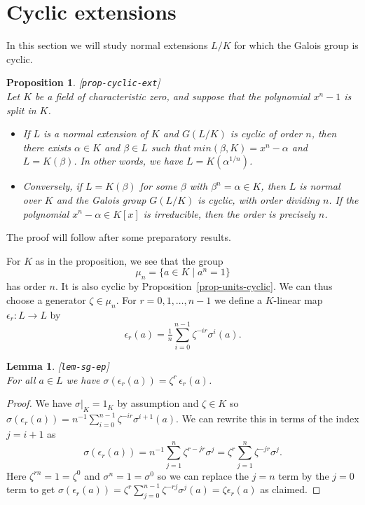 \documentclass{amsart}
\newcommand{\lbl}[1]{\label{#1}\textup{[\texttt{#1}]}\ \\}
\newcommand{\lbl}{\label}
\newcommand{\al}        {\alpha}
\newcommand{\bt}        {\beta}
\newcommand{\zt}        {\zeta}
\newcommand{\ep}        {\epsilon}
\newcommand{\sg}        {\sigma}
\newcommand{\st}        {\;|\;}
\renewcommand{\:}{\colon}
\newtheorem{lemma}[theorem]{Lemma}
\newtheorem{proposition}[theorem]{Proposition}
\theoremstyle{definition}
\begin{document}
\section{Cyclic extensions}
\label{sec-cyclic}

In this section we will study normal extensions $L/K$ for which the
Galois group is cyclic.

\begin{proposition}\lbl{prop-cyclic-ext}
 Let $K$ be a field of characteristic zero, and suppose that the
 polynomial $x^n-1$ is split in $K$.
 \begin{itemize}
  \item[(a)] If $L$ is a normal extension of $K$ and $G(L/K)$ is
   cyclic of order $n$, then there exists $\al\in K$ and $\bt\in L$
   such that $min(\bt,K)=x^n-\al$ and $L=K(\bt)$.  In other words, we
   have $L=K(\al^{1/n})$.
  \item[(b)] Conversely, if $L=K(\bt)$ for some $\bt$ with
   $\bt^n=\al\in K$, then $L$ is normal over $K$ and the Galois group
   $G(L/K)$ is cyclic, with order dividing $n$.  If the polynomial
   $x^n-\al\in K[x]$ is irreducible, then the order is precisely $n$. 
 \end{itemize}
\end{proposition}

The proof will follow after some preparatory results.

For $K$ as in the proposition, we see that the group 
\[ \mu_n = \{a\in K\st a^n=1\} \] 
has order $n$.  It is also cyclic by
Proposition~\ref{prop-units-cyclic}.  We can thus choose a generator
$\zt\in\mu_n$.  For $r=0,1,\dotsc,n-1$ we define a $K$-linear map
$\ep_r\:L\to L$ by 
\[ \ep_r(a) = \tfrac{1}{n} \sum_{i=0}^{n-1}\zt^{-ir}\sg^i(a).  \]

\begin{lemma}\lbl{lem-sg-ep}
 For all $a\in L$ we have $\sg(\ep_r(a))=\zt^r\,\ep_r(a)$. 
\end{lemma}
\begin{proof}
 We have $\sg|_K=1_K$ by assumption and $\zt\in K$ so
 $\sg(\ep_r(a))=n^{-1}\sum_{i=0}^{n-1}\zt^{-ir}\sg^{i+1}(a)$.  We can rewrite
 this in terms of the index $j=i+1$ as
 \[ \sg(\ep_r(a)) =
    n^{-1}\sum_{j=1}^n\zt^{r-jr}\sg^j = 
    \zt^r\sum_{j=1}^n\zt^{-jr}\sg^j.
 \]
 Here $\zt^{rn}=1=\zt^0$ and $\sg^n=1=\sg^0$ so we can replace the $j=n$
 term by the $j=0$ term to get
 $\sg(\ep_r(a))=\zt^r\sum_{j=0}^{n-1}\zt^{-rj}\sg^j(a)=\zt\ep_r(a)$ as
 claimed.
\end{proof}
\end{document}
